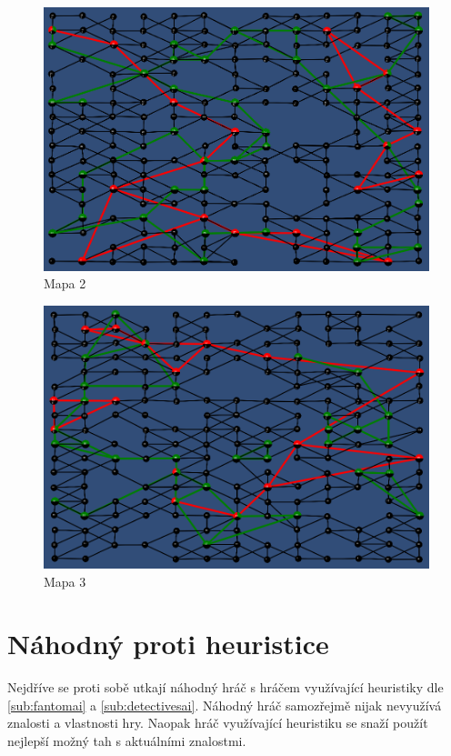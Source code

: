 \begin{figure}[h]
  \centering
  \includegraphics[width=1\textwidth]{mapa2.png}
  \caption{Mapa 2}
  \label{fig:map2}
\end{figure}

\begin{figure}[h]
  \centering
  \includegraphics[width=1\textwidth]{mapa3.png}
  \caption{Mapa 3}
  \label{fig:map3}
\end{figure}
\clearpage

\section{Náhodný proti heuristice}
Nejdříve se proti sobě utkají náhodný hráč s hráčem využívající heuristiky dle \cref{sub:fantomai} a \cref{sub:detectivesai}. Náhodný hráč samozřejmě nijak nevyužívá znalosti a vlastnosti hry. Naopak hráč využívající heuristiku se snaží použít nejlepší možný tah s aktuálními znalostmi.

